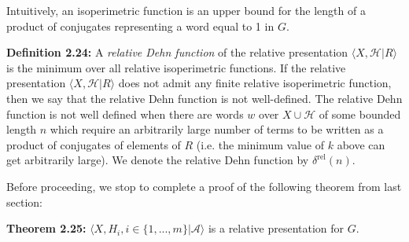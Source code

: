 \documentclass[12pt]{article}
\newcommand{\vs}{\vskip10pt}
\begin{document}
	Intuitively, an isoperimetric function is an upper bound for the length of a product of conjugates representing a word equal to 1 in $G$. 
	
	\vs 
	
	\textbf{Definition 2.24: } A \textit{relative Dehn function} of the relative presentation  $\langle X, \mathcal{H} \vert R \rangle$ is the minimum over all relative isoperimetric functions. If the relative presentation $\langle X, \mathcal{H} \vert R \rangle$ does not admit any finite relative isoperimetric function, then we say that the relative Dehn function is not well-defined. The relative Dehn function is not well defined when there are words $w$ over $X \cup \mathcal{H}$ of some bounded length $n$ which require an arbitrarily large number of terms to be written as a product of conjugates of elements of $R$ (i.e. the minimum value of $k$ above can get arbitrarily large). We denote the relative Dehn function by $\delta^{\text{rel}}(n)$.
	
	\vs 
	
	Before proceeding, we stop to complete a proof of the following theorem from last section: 
	
	\vs 
	
	\textbf{Theorem 2.25: } $\langle X, H_i, i \in \{1,...,m\} \vert \mathcal{A} \rangle$ is a relative presentation for $G$. 
	
\end{document}
